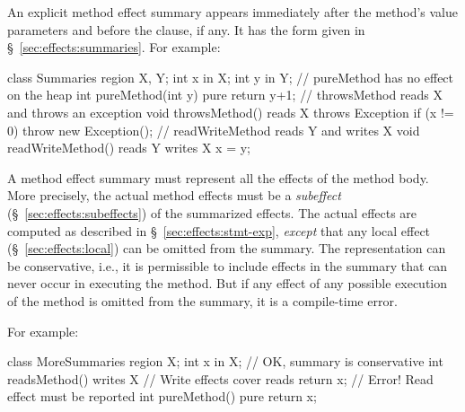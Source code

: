  An explicit method effect
summary appears immediately after the method's value parameters and
before the  clause, if any.  It has the form given in
\S~\ref{sec:effects:summaries}.  For example:
%
\begin{dpjlisting}
class Summaries {
  region X, Y;
  int x in X;
  int y in Y;
  // pureMethod has no effect on the heap
  int pureMethod(int y) pure { return y+1; }
  // throwsMethod reads X and throws an exception
  void throwsMethod() 
    reads X
    throws Exception 
  {
    if (x != 0) throw new Exception();
  }
  // readWriteMethod reads Y and writes X
  void readWriteMethod() 
    reads Y 
    writes X 
  {
    x = y;
  }
}
\end{dpjlisting}
%

A method effect summary must represent all the effects of the method
body.  More precisely, the actual method effects must be a
\emph{subeffect} (\S~\ref{sec:effects:subeffects}) of the summarized
effects.  The actual effects are computed as described in
\S~\ref{sec:effects:stmt-exp}, \emph{except} that any local effect
(\S~\ref{sec:effects:local}) can be omitted from the summary.  The
representation can be conservative, i.e., it is permissible to include
effects in the summary that can never occur in executing the method.
But if any effect of any possible execution of the method is omitted
from the summary, it is a compile-time error.  

For example:
%
\begin{dpjlisting}
class MoreSummaries {
  region X;
  int x in X;
  // OK, summary is conservative
  int readsMethod() 
    writes X 
  {
    // Write effects cover reads
    return x;
  }
  // Error!  Read effect must be reported
  int pureMethod() 
    pure 
  {
    return x;
  }
}
\end{dpjlisting}
%

